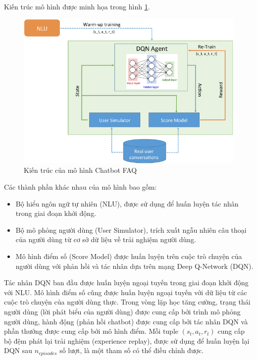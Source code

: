 Kiến trúc mô hình được minh họa trong hình \ref{fig:selfimprovingarch}.

\begin{figure}[ht]
    \centering
    \includegraphics[width=1\textwidth]{thesis/chatbot/congtrinh/img/selfimproving_arch.png}
    \caption{Kiến trúc của mô hình Chatbot FAQ}
    \label{fig:selfimprovingarch}
\end{figure}

Các thành phần khác nhau của mô hình bao gồm:
\begin{itemize}
    \item Bộ hiểu ngôn ngữ tự nhiên (NLU), được sử dụng để huấn luyện
    tác nhân trong giai đoạn khởi động.
    \item Bộ mô phỏng người dùng (User Simulator), trích xuất
    ngẫu nhiên câu thoại của người dùng từ cơ sở dữ liệu về
    trải nghiệm người dùng.
    \item Mô hình điểm số (Score Model) được huấn luyện trên cuộc
    trò chuyện của người dùng với phản hồi và tác nhân dựa trên
    mạng Deep Q-Network (DQN).
\end{itemize}

Tác nhân DQN ban đầu được huấn luyện ngoại tuyến trong giai đoạn
khởi động với NLU. Mô hình điểm số cũng được huấn luyện ngoại tuyến
với dữ liệu từ các cuộc trò chuyện của người dùng thực. Trong
vòng lặp học tăng cường, trạng thái người dùng (lời phát biểu của
người dùng) được cung cấp bởi trình mô phỏng người dùng, hành động
(phản hồi chatbot) được cung cấp bởi tác nhân DQN và phần thưởng
được cung cấp bởi mô hình điểm. Mỗi tuple $(s_t, a_t, r_t)$ cung cấp
bộ đệm phát lại trải nghiệm (experience replay), được sử dụng để
huấn luyện lại DQN sau $n_{episodes}$ số lượt, là một tham số có thể
điều chỉnh được.

